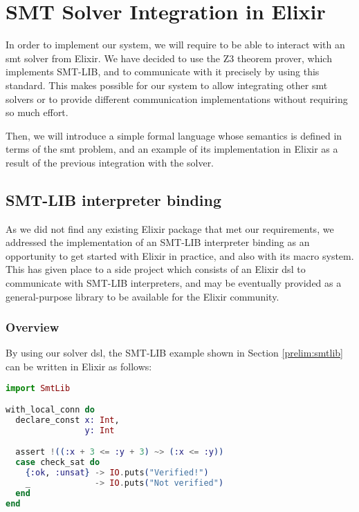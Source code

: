 \chapter{SMT Solver Integration in Elixir}
\label{cap:smtSolverIntegration}

In order to implement our system, we will require to be able to interact with an
\acrshort{smt} solver from Elixir. We have decided to use the Z3 theorem prover,
which implements SMT-LIB, and to communicate with it precisely by using this
standard. This makes possible for our system to allow integrating other 
\acrshort{smt} solvers or to provide different communication implementations
without requiring so much effort.

Then, we will introduce a simple formal language whose semantics is defined in
terms of the \gls{smt} problem, and an example of its implementation in Elixir
as a result of the previous integration with the solver.

\section{SMT-LIB interpreter binding}

As we did not find any existing Elixir package that met our requirements, we
addressed the implementation of an SMT-LIB interpreter binding as an opportunity
to get started with Elixir in practice, and also with its macro system. This has
given place to a side project which consists of an Elixir \gls{dsl} to
communicate with SMT-LIB interpreters, and may be eventually provided as a 
general-purpose library to be available for the Elixir community.

\subsection{Overview}
\label{integ:dslexample}

By using our solver \gls{dsl}, the SMT-LIB example shown in Section
\ref{prelim:smtlib} can be written in Elixir as follows:

\begin{lstlisting}[language=elixir,numbers=none,frame=none]
import SmtLib

with_local_conn do
  declare_const x: Int,
                y: Int

  assert !((:x + 3 <= :y + 3) ~> (:x <= :y))
  case check_sat do 
    {:ok, :unsat} -> IO.puts("Verified!")
    _             -> IO.puts("Not verified")
  end
end
\end{lstlisting}

